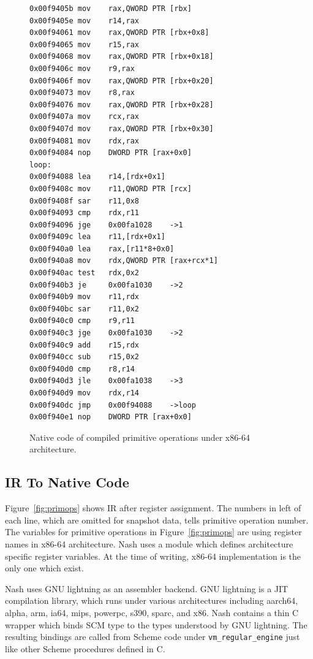 \documentclass[preprint, 10pt]{sigplanconf}
\begin{document}
\begin{figure}
  \centering
  \small
\begin{verbatim}
0x00f9405b mov    rax,QWORD PTR [rbx]
0x00f9405e mov    r14,rax
0x00f94061 mov    rax,QWORD PTR [rbx+0x8]
0x00f94065 mov    r15,rax
0x00f94068 mov    rax,QWORD PTR [rbx+0x18]
0x00f9406c mov    r9,rax
0x00f9406f mov    rax,QWORD PTR [rbx+0x20]
0x00f94073 mov    r8,rax
0x00f94076 mov    rax,QWORD PTR [rbx+0x28]
0x00f9407a mov    rcx,rax
0x00f9407d mov    rax,QWORD PTR [rbx+0x30]
0x00f94081 mov    rdx,rax
0x00f94084 nop    DWORD PTR [rax+0x0]
loop:
0x00f94088 lea    r14,[rdx+0x1]
0x00f9408c mov    r11,QWORD PTR [rcx]
0x00f9408f sar    r11,0x8
0x00f94093 cmp    rdx,r11
0x00f94096 jge    0x00fa1028    ->1
0x00f9409c lea    r11,[rdx+0x1]
0x00f940a0 lea    rax,[r11*8+0x0]
0x00f940a8 mov    rdx,QWORD PTR [rax+rcx*1]
0x00f940ac test   rdx,0x2
0x00f940b3 je     0x00fa1030    ->2
0x00f940b9 mov    r11,rdx
0x00f940bc sar    r11,0x2
0x00f940c0 cmp    r9,r11
0x00f940c3 jge    0x00fa1030    ->2
0x00f940c9 add    r15,rdx
0x00f940cc sub    r15,0x2
0x00f940d0 cmp    r8,r14
0x00f940d3 jle    0x00fa1038    ->3
0x00f940d9 mov    rdx,r14
0x00f940dc jmp    0x00f94088    ->loop
0x00f940e1 nop    DWORD PTR [rax+0x0]
\end{verbatim}
\caption{Native code of compiled primitive operations under x86-64
  architecture.}
\label{fig:ncode}
\end{figure}

\subsection{IR To Native Code}
Figure~\hyperref[fig:primops]{\ref{fig:primops}} shows IR after register
assignment. The numbers in left of each line, which are omitted for snapshot
data, tells primitive operation number. The variables for primitive operations
in Figure~\hyperref[fig:primops]{\ref{fig:primops}} are using register names in
x86-64 architecture. Nash uses a module which defines architecture specific
register variables. At the time of writing, x86-64 implementation is the only
one which exist.

Nash uses GNU lightning as an assembler backend\cite{}. GNU lightning is a JIT
compilation library, which runs under various architectures including aarch64,
alpha, arm, ia64, mips, powerpc, s390, sparc, and x86. Nash contains a thin C
wrapper which binds SCM type to the types understood by GNU lightning. The
resulting bindings are called from Scheme code under
\texttt{vm\_regular\_engine} just like other Scheme procedures defined in
C.
\end{document}
